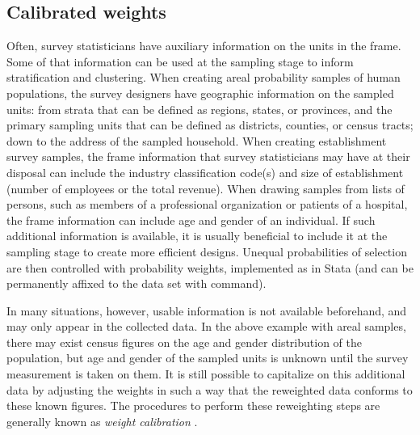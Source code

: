 \subsection{Calibrated weights}
\label{subsec:calibration}

Often, survey statisticians have auxiliary information on the units
in the frame. Some of that information can be used at the sampling
stage to inform stratification and clustering. When creating areal
probability samples of human populations, the survey designers have
geographic information on the sampled units: from strata
that can be defined as regions, states, or provinces, and the primary
sampling units that can be defined as districts, counties, or census tracts;
down to the address of the sampled household. When creating establishment
survey samples, the frame information that survey statisticians may have
at their disposal can include the industry classification code(s) and size
of establishment (number of employees or the total revenue).
When drawing samples from lists of persons, such as members of a
professional organization or patients of a hospital, the frame information
can include age and gender of an individual. If such additional information
is available, it is usually beneficial to include it at the sampling stage
to create more efficient designs. Unequal probabilities of selection
are then controlled with probability weights, implemented
as \stcmd{[pw=}{\it exp}\stcmd{]} in Stata (and can be permanently
affixed to the data set with  command).

In many situations, however, usable information is not available beforehand,
and may only appear in the collected data. In the above example with
areal samples, there may exist census figures on the age and gender
distribution of the population, but age and gender of the sampled units
is unknown until the survey measurement is taken on them.
It is still possible to capitalize on this additional data by
adjusting the weights in such a way that the reweighted data
conforms to these known figures. The procedures to perform these
reweighting steps are generally known as {\it weight calibration}
\citep{deville:sarndal:1992,deville:sarndal:sautory:1993,%
kott:2006,kott:2009,sarndal:2007}.

